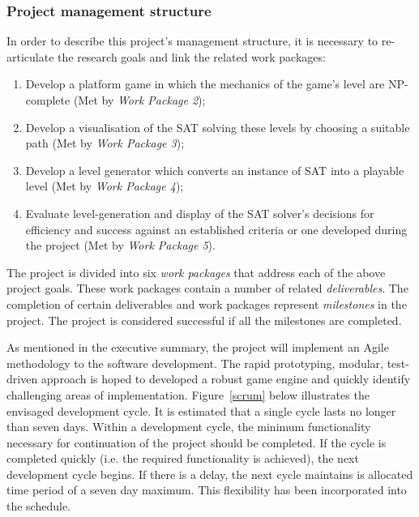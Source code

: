 \documentclass[a4paper]{article}
\begin{document}
\subsubsection{Project management structure}

In order to describe this project's management structure, it is necessary to re-articulate the
research goals and link the related work packages:

\begin{enumerate}

  \item Develop a platform game in which the mechanics of the game's level are NP-complete (Met by \textit{Work Package 2}); 
  \item Develop a visualisation of the SAT solving these levels by choosing a suitable path (Met by \textit{Work Package 3});   
  \item Develop a level generator which converts an instance of SAT into a playable level (Met by \textit{Work Package 4});         
  \item Evaluate level-generation and display of the SAT solver's decisions for efficiency and success against an 
        established criteria or one developed during the project (Met by \textit{Work Package 5}). 

\end{enumerate}

The project is divided into six \textit{work packages} that address each of the above project
goals. These work packages contain a number of related \textit{deliverables}. The completion of
certain deliverables and work packages represent \textit{milestones} in the project. The project is
considered successful if all the milestones are completed.

As mentioned in the executive summary, the project will implement an Agile methodology to the
software development. The rapid prototyping, modular, test-driven approach is hoped to developed a
robust game engine and quickly identify challenging areas of implementation. Figure~\ref{scrum}
below illustrates the envisaged development cycle. It is estimated that a single cycle
lasts no longer than seven days. Within a development cycle, the minimum functionality necessary for
continuation of the project should be completed. If the cycle is completed quickly (i.e. the
required functionality is achieved), the next development cycle begins. If there is a delay, the
next cycle maintains is allocated time period of a seven day maximum. This flexibility has been
incorporated into the schedule.
\end{document}
